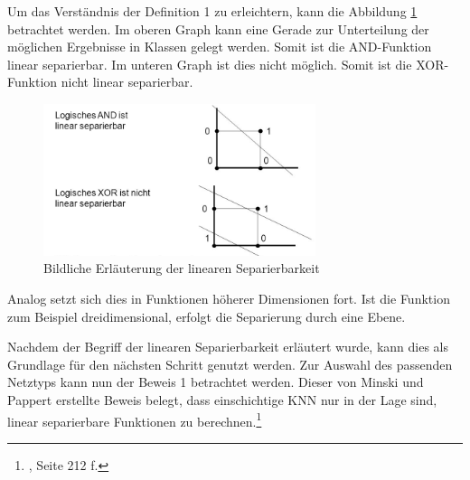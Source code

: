 Um das Verständnis der Definition 1 zu erleichtern, kann die Abbildung \ref{fig:Bildliche Erläuterung der linearen Separierbarkeit} betrachtet werden. Im oberen Graph kann eine Gerade zur Unterteilung der möglichen Ergebnisse in Klassen gelegt werden. Somit ist die AND-Funktion linear separierbar. Im unteren Graph ist dies nicht möglich. Somit ist die XOR-Funktion nicht linear separierbar.  

\begin{figure}[H]
\centering
		\includegraphics[width=0.71\textwidth]{Linear_Sep.PNG}
	\caption{Bildliche Erläuterung der linearen Separierbarkeit}
	\label{fig:Bildliche Erläuterung der linearen Separierbarkeit}
\end{figure}

Analog setzt sich dies in Funktionen höherer Dimensionen fort. Ist die Funktion zum Beispiel dreidimensional, erfolgt die Separierung durch eine Ebene.

Nachdem der Begriff der linearen Separierbarkeit erläutert wurde, kann dies als Grundlage für den nächsten Schritt genutzt werden. Zur Auswahl des passenden Netztyps kann nun der Beweis 1 betrachtet werden. Dieser von Minski und Pappert erstellte Beweis  belegt, dass einschichtige KNN nur in der Lage sind, linear separierbare Funktionen zu berechnen.\footnote{\Vgl{}, Seite 212 f.}

\newpage

